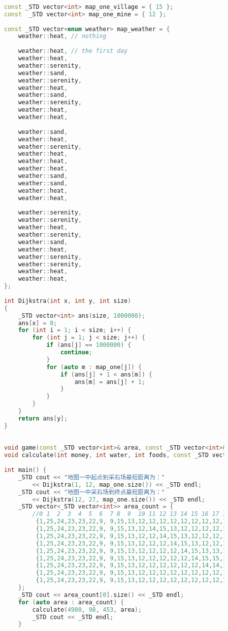 \documentclass{cumcmthesis}
\begin{document}
\begin{appendices}
\begin{lstlisting}[language=c++]
		
		const _STD vector<int> map_one_village = { 15 };
		const  _STD vector<int> map_one_mine = { 12 };
		
		const _STD vector<enum weather> map_weather = {
			weather::heat, // nothing
		
			weather::heat, // the first day
			weather::heat,
			weather::serenity,
			weather::sand,
			weather::serenity,
			weather::heat,
			weather::sand,
			weather::serenity,
			weather::heat,
			weather::heat,
		
			weather::sand,
			weather::heat,
			weather::serenity,
			weather::heat,
			weather::heat,
			weather::heat,
			weather::sand,
			weather::sand,
			weather::heat,
			weather::heat,
		
			weather::serenity,
			weather::serenity,
			weather::heat,
			weather::serenity,
			weather::sand,
			weather::heat,
			weather::serenity,
			weather::serenity,
			weather::heat,
			weather::heat,
		};
		
		int Dijkstra(int x, int y, int size)
		{
			_STD vector<int> ans(size, 1000000);
			ans[x] = 0;
			for (int i = 1; i < size; i++) {
				for (int j = 1; j < size; j++) {
					if (ans[j] == 1000000) {
						continue;
					}
					for (auto m : map_one[j]) {
						if (ans[j] + 1 < ans[m]) {
							ans[m] = ans[j] + 1;
						}
					}
				}
			}
			return ans[y];
		}
		
		
		void game(const _STD vector<int>& area, const _STD vector<int>& mine);
		void calculate(int money, int water, int foods, const _STD vector<int>& area);
		
		int main() {
			_STD cout << "地图一中起点到采石场最短距离为："
				<< Dijkstra(1, 12, map_one.size()) << _STD endl;
			_STD cout << "地图一中采石场到终点最短距离为："
				<< Dijkstra(12, 27, map_one.size()) << _STD endl;
			_STD vector<_STD vector<int>> area_count = {
				//0 1  2  3  4  5  6  7 8  9  10 11 12 13 14 15 16 17 18 19 20 21 22 23 24 25 26 27 28 29 30
				 {1,25,24,23,23,22,9, 9,15,13,12,12,12,12,12,12,12,12,12,12,12,12,12,12,12,12,14,15,9 ,21,27},
				 {1,25,24,23,23,22,9, 9,15,13,12,14,15,13,12,12,12,12,12,12,12,12,12,12,12,12,14,15,9 ,21,27},
				 {1,25,24,23,23,22,9, 9,15,13,12,12,14,15,13,12,12,12,12,12,12,12,12,12,12,12,14,15,9 ,21,27},
				 {1,25,24,23,23,22,9, 9,15,13,12,12,12,14,15,13,12,12,12,12,12,12,12,12,12,12,14,15,9 ,21,27},
				 {1,25,24,23,23,22,9, 9,15,13,12,12,12,12,14,15,13,13,13,12,12,12,12,12,12,12,14,15,9 ,21,27},
				 {1,25,24,23,23,22,9, 9,15,13,12,12,12,12,12,14,15,15,15,13,12,12,12,12,12,12,14,15,9 ,21,27},
				 {1,25,24,23,23,22,9, 9,15,13,12,12,12,12,12,12,14,14,14,15,13,12,12,12,12,12,14,15,9 ,21,27},
				 {1,25,24,23,23,22,9, 9,15,13,12,12,12,12,12,12,12,12,12,14,15,13,12,12,12,12,14,15,9 ,21,27},
				 {1,25,24,23,23,22,9, 9,15,13,12,12,12,12,12,12,12,12,12,12,14,15,13,12,12,12,14,15,9 ,21,27},
			};
			_STD cout << area_count[0].size() << _STD endl;
			for (auto area : area_count) {
				calculate(4980, 98, 453, area);
				_STD cout << _STD endl;
			}
		

\end{lstlisting}
\end{appendices}
\end{document}
